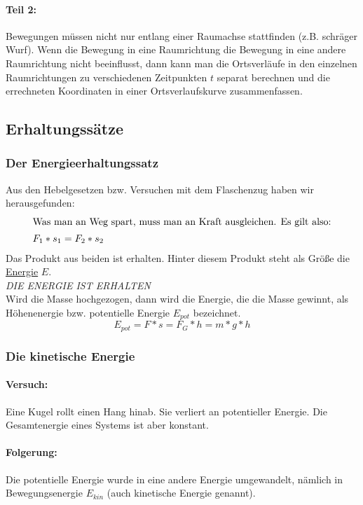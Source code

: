 	\paragraph{Teil 2:}
	Bewegungen müssen nicht nur entlang einer Raumachse stattfinden (z.B. schräger Wurf). Wenn die Bewegung in eine Raumrichtung die Bewegung in eine andere Raumrichtung nicht beeinflusst, dann kann man die Ortsverläufe in den einzelnen Raumrichtungen zu verschiedenen Zeitpunkten $ t $ separat berechnen und die errechneten Koordinaten in einer Ortsverlaufskurve zusammenfassen.
	
	\subsection{Erhaltungssätze}
	\subsubsection{Der Energieerhaltungssatz}
	Aus den Hebelgesetzen bzw. Versuchen mit dem Flaschenzug haben wir herausgefunden:
	\begin{align}
		\intertext{Was man an Weg spart, muss man an Kraft ausgleichen. Es gilt also:}
		F_1*s_1=F_2*s_2
	\end{align}
	Das Produkt aus beiden ist erhalten. Hinter diesem Produkt steht als Größe die \underline{Energie} $ E $.\\
	\emph{DIE ENERGIE IST ERHALTEN}\\
	Wird die Masse hochgezogen, dann wird die Energie, die die Masse gewinnt, als Höhenenergie bzw. potentielle Energie $ E_{pot} $ bezeichnet.
	\begin{equation}
		E_{pot} = F*s = F_G*h = m*g*h
	\end{equation}
	
	\subsubsection{Die kinetische Energie}
	\paragraph{Versuch:}
	Eine Kugel rollt einen Hang hinab. Sie verliert an potentieller Energie. Die Gesamtenergie eines Systems ist aber konstant.
	\paragraph{Folgerung:}
	Die potentielle Energie wurde in eine andere Energie umgewandelt, nämlich in Bewegungsenergie $ E_{kin} $ (auch kinetische Energie genannt).
